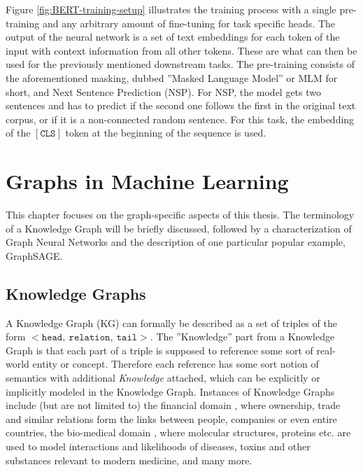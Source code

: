 \documentclass[draft,final]{vutinfth} %
\begin{document}
Figure \ref{fig:BERT-training-setup} illustrates the training process with a single pre-training and any arbitrary amount of fine-tuning for task specific heads. The output of the neural network is a set of text embeddings for each token of the input with context information from all other tokens. These are what can then be used for the previously mentioned downstream tasks. The pre-training consists of the aforementioned masking, dubbed ''Masked Language Model'' or MLM for short, and Next Sentence Prediction (NSP). For NSP, the model gets two sentences and has to predict if the second one follows the first in the original text corpus, or if it is a non-connected random sentence. For this task, the embedding of the $\mathtt{[CLS]}$ token at the beginning of the sequence is used. \cite{BERT}

\chapter{Graphs in Machine Learning} \label{chap:graph_ml}
This chapter focuses on the graph-specific aspects of this thesis. The terminology of a Knowledge Graph will be briefly discussed, followed by a characterization of Graph Neural Networks and the description of one particular popular example, GraphSAGE.


\section{Knowledge Graphs}
A Knowledge Graph (KG) can formally be described as a set of triples of the form 
$\mathtt{< head,\ relation,\ tail>}$. The ''Knowledge'' part from a Knowledge Graph is that each part of a triple is supposed to reference some sort of real-world entity or concept. Therefore each reference has some sort notion of semantics with additional \textit{Knowledge} attached, which can be explicitly or implicitly modeled in the Knowledge Graph. Instances of Knowledge Graphs include (but are not limited to) the financial domain \cite{Bellomarini_Magnanimi_Nissl_Sallinger_2021}, where ownership, trade and similar relations form the links between people, companies or even entire countries, the bio-medical domain \cite{Lu_Goi_Zhao_Wang_2025}, where molecular structures, proteins etc. are used to model interactions and likelihoods of diseases, toxins and other substances relevant to modern medicine, and many more.
\end{document}
